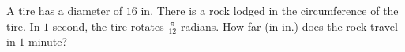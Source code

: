 A tire has a diameter of $16$ in. There is a rock lodged in the circumference of the tire. In $1$ second, the tire rotates $\frac{\pi}{12}$ radians. How far (in in.) does the rock travel in $1$ minute?
